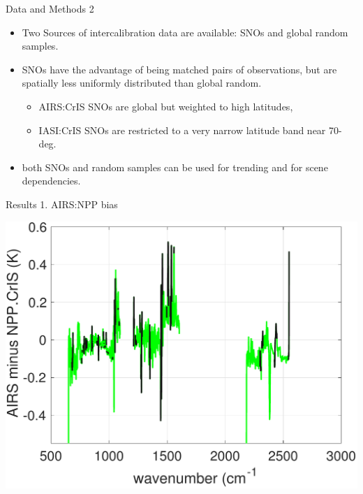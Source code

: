 \documentclass[10pt,t]{beamer}
\begin{document}
\begin{frame}{Data and Methods 2}

  \begin{itemize}
  \item Two Sources of intercalibration data are available: SNOs and global random samples.
  \item SNOs have the advantage of being matched pairs of observations, but are spatially less uniformly distributed than global random.
    \begin{itemize}
    \item AIRS:CrIS SNOs are global but weighted to high latitudes,
    \item IASI:CrIS SNOs are restricted to a very narrow latitude band near 70-deg.
    \end{itemize}
  \item both SNOs and random samples can be used for trending and for scene dependencies.
    
  \end{itemize}

\end{frame}

\begin{frame}{Results 1. AIRS:NPP bias}

\vspace{-0.1in}
\begin{block}{}
  \begin{center}
    \includegraphics[width=0.6\linewidth]{./Figs/2018_airs_npp_ac1_stats_bias_wbad_fill.pdf}
  \end{center}
\end{block}
    
\end{frame}
\end{document}
